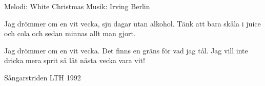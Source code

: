 \begin{song}

\begin{songmeta}
Melodi: White Christmas
Musik: Irving Berlin
\end{songmeta}

\begin{songtext}
Jag drömmer om en vit vecka,
sju dagar utan alkohol.
Tänk att bara skåla
i juice och cola
och sedan minnas allt man gjort.

Jag drömmer om en vit vecka.
Det finns en gräns för vad jag tål.
Jag vill inte dricka mera sprit
så låt nästa vecka vara vit!
\end{songtext}

\begin{songnotes}
Sångarstriden LTH 1992
\end{songnotes}
\end{song}
